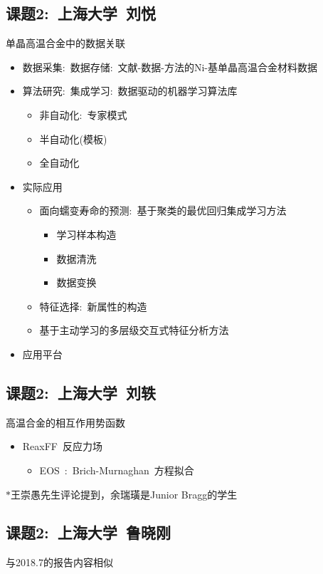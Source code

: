 \documentclass[10pt,a4paper]{article}
\begin{document}
\begin{itemize}
\subsection{课题2:~上海大学~刘悦}
单晶高温合金中的数据关联
\begin{itemize}
	\item 数据采集:~数据存储:~文献-数据-方法的\textrm{Ni}-基单晶高温合金材料数据
	\item 算法研究:~集成学习:~数据驱动的机器学习算法库
		\begin{itemize}
			\item 非自动化:~专家模式
			\item 半自动化(模板)
			\item 全自动化
		\end{itemize}
	\item 实际应用
		\begin{itemize}
			\item 面向蠕变寿命的预测:~基于聚类的最优回归集成学习方法
				\begin{itemize}
					\item 学习样本构造
					\item 数据清洗
					\item 数据变换
				\end{itemize}
			\item 特征选择:~新属性的构造
			\item 基于主动学习的多层级交互式特征分析方法
		\end{itemize}
	\item 应用平台
\end{itemize}

\subsection{课题2:~上海大学~刘轶}
高温合金的相互作用势函数
\begin{itemize}
	\item \textrm{ReaxFF~}反应力场
		\begin{itemize}
			\item \textrm{EOS~}:~\textrm{Brich-Murnaghan~}方程拟合
		\end{itemize}
\end{itemize}
$\ast$王崇愚先生评论提到，余瑞璜是\textrm{Junior Bragg}的学生

\subsection{课题2:~上海大学~鲁晓刚}
与\textrm{2018.7}的报告内容相似


\end{itemize}
\end{document}
